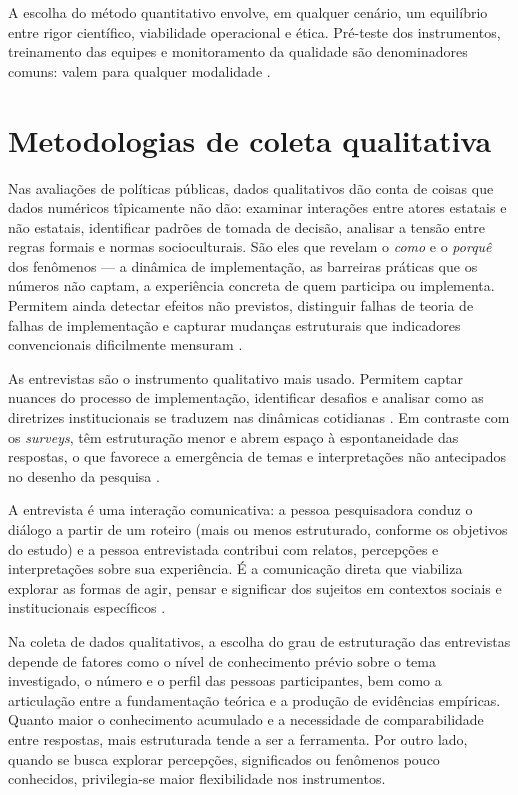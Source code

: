 \documentclass[12pt, a4paper, openany]{book}
\begin{document}
A escolha do m\'etodo quantitativo envolve, em qualquer cen\'ario, um equil\'ibrio entre rigor cient\'ifico, viabilidade operacional e \'etica. Pr\'e-teste dos instrumentos, treinamento das equipes e monitoramento da qualidade s\~ao denominadores comuns: valem para qualquer modalidade \citep{morra2009road,kopper2021survey}.

\section{Metodologias de coleta qualitativa}

Nas avalia\c{c}\~oes de pol\'iticas p\'ublicas, dados qualitativos d\~ao conta de coisas que dados num\'ericos t\^ipicamente n\~ao d\~ao: examinar intera\c{c}\~oes entre atores estatais e n\~ao estatais, identificar padr\~oes de tomada de decis\~ao, analisar a tens\~ao entre regras formais e normas socioculturais. S\~ao eles que revelam o \textit{como} e o \textit{porqu\^e} dos fen\^omenos --- a din\^amica de implementa\c{c}\~ao, as barreiras pr\'aticas que os n\'umeros n\~ao captam, a experi\^encia concreta de quem participa ou implementa. Permitem ainda detectar efeitos n\~ao previstos, distinguir falhas de teoria de falhas de implementa\c{c}\~ao e capturar mudan\c{c}as estruturais que indicadores convencionais dificilmente mensuram \citep{fgvclear2025mea}.

As entrevistas s\~ao o instrumento qualitativo mais usado. Permitem captar nuances do processo de implementa\c{c}\~ao, identificar desafios e analisar como as diretrizes institucionais se traduzem nas din\^amicas cotidianas \citep{lotta2020categorizando}. Em contraste com os \textit{surveys}, t\^em estrutura\c{c}\~ao menor e abrem espa\c{c}o \`a espontaneidade das respostas, o que favorece a emerg\^encia de temas e interpreta\c{c}\~oes n\~ao antecipados no desenho da pesquisa \citep{lima2016entrevistas}.

A entrevista \'e uma intera\c{c}\~ao comunicativa: a pessoa pesquisadora conduz o di\'alogo a partir de um roteiro (mais ou menos estruturado, conforme os objetivos do estudo) e a pessoa entrevistada contribui com relatos, percep\c{c}\~oes e interpreta\c{c}\~oes sobre sua experi\^encia. \'E a comunica\c{c}\~ao direta que viabiliza explorar as formas de agir, pensar e significar dos sujeitos em contextos sociais e institucionais espec\'ificos \citep{leitao2024entrevista}.

Na coleta de dados qualitativos, a escolha do grau de estrutura\c{c}\~ao das entrevistas depende de fatores como o n\'ivel de conhecimento pr\'evio sobre o tema investigado, o n\'umero e o perfil das pessoas participantes, bem como a articula\c{c}\~ao entre a fundamenta\c{c}\~ao te\'orica e a produ\c{c}\~ao de evid\^encias emp\'iricas. Quanto maior o conhecimento acumulado e a necessidade de comparabilidade entre respostas, mais estruturada tende a ser a ferramenta. Por outro lado, quando se busca explorar percep\c{c}\~oes, significados ou fen\^omenos pouco conhecidos, privilegia-se maior flexibilidade nos instrumentos.
\end{document}
